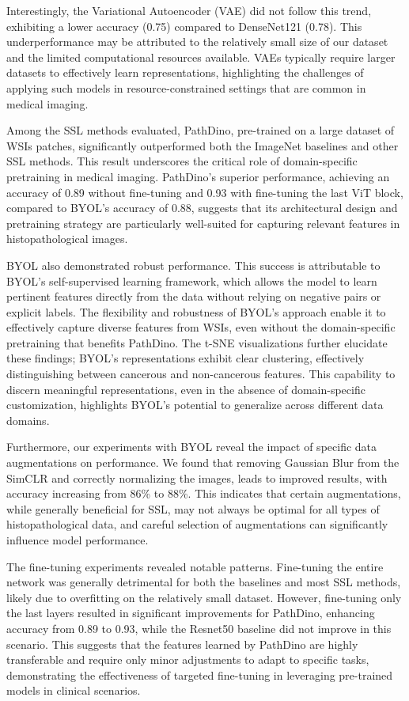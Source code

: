 \documentclass[peerreview]{IEEEtran}
\begin{document}
Interestingly, the Variational Autoencoder (VAE) did not follow this trend, exhibiting a lower accuracy (0.75) compared to DenseNet121 (0.78). This underperformance may be attributed to the relatively small size of our dataset and the limited computational resources available. VAEs typically require larger datasets to effectively learn representations, highlighting the challenges of applying such models in resource-constrained settings that are common in medical imaging.

Among the SSL methods evaluated, PathDino, pre-trained on a large dataset of WSIs patches, significantly outperformed both the ImageNet baselines and other SSL methods. This result underscores the critical role of domain-specific pretraining in medical imaging. PathDino's superior performance, achieving an accuracy of 0.89 without fine-tuning and 0.93 with fine-tuning the last ViT block, compared to BYOL's accuracy of 0.88, suggests that its architectural design and pretraining strategy are particularly well-suited for capturing relevant features in histopathological images.

BYOL also demonstrated robust performance. This success is attributable to BYOL's self-supervised learning framework, which allows the model to learn pertinent features directly from the data without relying on negative pairs or explicit labels. The flexibility and robustness of BYOL's approach enable it to effectively capture diverse features from WSIs, even without the domain-specific pretraining that benefits PathDino. The t-SNE visualizations further elucidate these findings; BYOL's representations exhibit clear clustering, effectively distinguishing between cancerous and non-cancerous features. This capability to discern meaningful representations, even in the absence of domain-specific customization, highlights BYOL's potential to generalize across different data domains.

Furthermore, our experiments with BYOL reveal the impact of specific data augmentations on performance. We found that removing Gaussian Blur from the SimCLR and correctly normalizing the images, leads to improved results, with accuracy increasing from 86\% to 88\%. This indicates that certain augmentations, while generally beneficial for SSL, may not always be optimal for all types of histopathological data, and careful selection of augmentations can significantly influence model performance.

The fine-tuning experiments revealed notable patterns. Fine-tuning the entire network was generally detrimental for both the baselines and most SSL methods, likely due to overfitting on the relatively small dataset. However, fine-tuning only the last layers resulted in significant improvements for PathDino, enhancing accuracy from 0.89 to 0.93, while the Resnet50 baseline did not improve in this scenario. This suggests that the features learned by PathDino are highly transferable and require only minor adjustments to adapt to specific tasks, demonstrating the effectiveness of targeted fine-tuning in leveraging pre-trained models in clinical scenarios.
\end{document}
